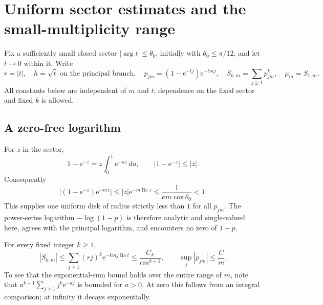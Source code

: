 \documentclass[11pt,letterpaper]{article}
\numberwithin{equation}{section}
\theoremstyle{definition}\newtheorem{definition}[theorem]{Definition}
\theoremstyle{remark}\newtheorem{remark}[theorem]{Remark}
\newcommand{\ee}{\mathrm e}
\DeclareMathOperator{\Rea}{Re}
\begin{document}
\section{Uniform sector estimates and the small-multiplicity range}\label{dmv:cnt:sec:sector}
Fix a sufficiently small closed sector $|\arg t|\le\theta_0$, initially with $\theta_0\le\pi/12$, and let $t\to0$ within it. Write
\begin{equation}\label{dmv:cnt:eq:sectornotation}
r=|t|,\quad h=\sqrt t\text{ on the principal branch},\quad
p_{jm}=(1-\ee^{-tj})\ee^{-tmj},\quad
S_{k,m}=\sum_{j\ge1}p_{jm}^k,\quad \mu_m=S_{1,m}.
\end{equation}
All constants below are independent of $m$ and $t$; dependence on the fixed sector and fixed $k$ is allowed.

\subsection{A zero-free logarithm}
For $z$ in the sector,
\[
1-\ee^{-z}=z\int_0^1\ee^{-uz}\,du,
\qquad |1-\ee^{-z}|\le|z|.
\]
Consequently
\begin{equation}\label{dmv:cnt:eq:zero-free}
|(1-\ee^{-z})\ee^{-mz}|
\le |z|\ee^{-m\Rea z}\le\frac1{em\cos\theta_0}<1.
\end{equation}
This supplies one uniform disk of radius strictly less than $1$ for all $p_{jm}$. The power-series logarithm $-\log(1-p)$ is therefore analytic and single-valued here, agrees with the principal logarithm, and encounters no zero of $1-p$.

For every fixed integer $k\ge1$,
\begin{equation}\label{dmv:cnt:eq:Sbound}
|S_{k,m}|\le \sum_{j\ge1}(rj)^k\ee^{-kmj\Rea t}
\le\frac{C_k}{r m^{k+1}},\qquad
\sup_j|p_{jm}|\le \frac Cm.
\end{equation}
To see that the exponential-sum bound holds over the entire range of $m$, note that $a^{k+1}\sum_{j\ge1}j^k\ee^{-aj}$ is bounded for $a>0$. At zero this follows from an integral comparison; at infinity it decays exponentially.
\end{document}
